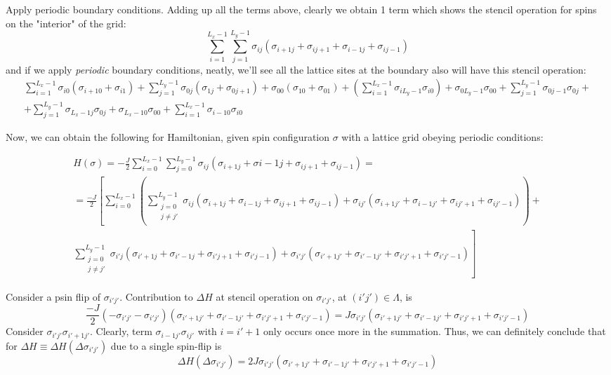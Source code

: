 \documentclass[10pt]{amsart}
\begin{document}
\begin{multicols*}{2}
Apply periodic boundary conditions.  Adding up all the terms above, clearly we obtain 1 term which shows the stencil operation for spins on the "interior" of the grid: 
\[
\sum_{i=1}^{L_x-1} \sum_{j=1}^{L_y-1} \sigma_{ij} ( \sigma_{i+1j} + \sigma_{ij+1} + \sigma_{i-1j} + \sigma_{ij-1} )
\]
and if we apply \emph{periodic} boundary conditions, neatly, we'll see all the lattice sites at the boundary also will have this stencil operation:  
\[
\begin{gathered}
	\sum_{i=1}^{L_x - 1} \sigma_{i0} (\sigma_{i+10} + \sigma_{i1} ) + \sum_{j=1}^{L_y-1} \sigma_{0j} (\sigma_{1j} + \sigma_{0j+1} ) + \sigma_{00} (\sigma_{10} + \sigma_{01} ) + \left( \sum_{i=1}^{L_x-1} \sigma_{iL_y-1} \sigma_{i0} \right) + \sigma_{0L_y-1} \sigma_{00} + \sum_{j=1}^{L_y-1} \sigma_{0j-1} \sigma_{0j} +  \\
	+ \sum_{j=1}^{L_y - 1} \sigma_{L_x- 1 j} \sigma_{0j} + \sigma_{L_x-1 0} \sigma_{00} + \sum_{i=1}^{L_x-1} \sigma_{i-10} \sigma_{i0} 
\end{gathered}
\]

Now, we can obtain the following for Hamiltonian, given spin configuration $\sigma$ with a lattice grid obeying periodic conditions:  

\begin{equation}
\begin{gathered}
H(\sigma) = -\frac{J}{2} \sum_{i=0}^{L_x-1} \sum_{j=0}^{L_y-1} \sigma_{ij} (\sigma_{i+1j } + \sigma{i-1j} + \sigma_{ij+1} + \sigma_{ij-1} ) = \\
= \frac{-J}{2} \left[  \sum_{i=0}^{L_x-1} \left( \sum_{ \substack{ j=0 \\ j \neq j' \\ } }^{L_y -1} \sigma_{ij} ( \sigma_{i+1j} +  \sigma_{i-1j} + \sigma_{ij+1} + \sigma_{ij-1} ) + \sigma_{ij'} ( \sigma_{i+1j'} + \sigma_{i-1j'} + \sigma_{ij'+1} + \sigma_{ij'-1}  ) \right)  + \right. \\ 
\left. \sum_{ \substack{j=0 \\ j\neq j' \\ } }^{L_y-1} \sigma_{i'j} ( \sigma_{i'+1j} + \sigma_{i'-1j} + \sigma_{i'j+1} + \sigma_{i'j-1} ) + \sigma_{i'j'} ( \sigma_{i'+1j'}  + \sigma_{i'-1j'} + \sigma_{i'j'+1} + \sigma_{i'j'-1}) \right] 
 \end{gathered}
\end{equation}

Consider a psin flip of $\sigma_{i'j'}$.  Contribution to $\Delta H$ at stencil operation on $\sigma_{i'j'}$, at $(i'j') \in \Lambda$, is 
\[
\frac{-J}{2} ( - \sigma_{i'j'} - \sigma_{i'j'} ) (\sigma_{i'+1j'} + \sigma_{i'-1j'} + \sigma_{i'j'+1} + \sigma_{i'j'-1}) = J\sigma_{i'j'} ( \sigma_{i'+1j'} + \sigma_{i'-1j'} + \sigma_{i'j'+1} + \sigma_{i'j'-1})
\]
Consider $\sigma_{i'j'} \sigma_{i'+1j'}$.  Clearly, term $\sigma_{i-1j'} \sigma_{ij'}$ with $i=i'+1$ only occurs once more in the summation.  Thus, we can definitely conclude that for $\Delta H \equiv \Delta H(\Delta \sigma_{i'j'})$ due to a single spin-flip is 
\begin{equation}
\Delta H(\Delta \sigma_{i'j'}) = 2J\sigma_{i'j'} ( \sigma_{i'+1j'} + \sigma_{i'-1j'} + \sigma_{i'j'+1} + \sigma_{i'j'-1} )
\end{equation}



\end{multicols*}
\end{document}
